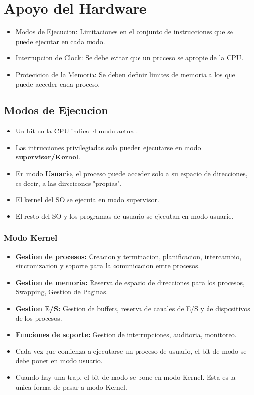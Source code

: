 \section{Apoyo del Hardware}
\begin{itemize}
    \item Modos de Ejecucion: Limitaciones en el conjunto de instrucciones que se puede ejecutar en cada modo.
    \item Interrupcion de Clock: Se debe evitar que un proceso se apropie de la CPU.
    \item Protecicion de la Memoria: Se deben definir limites de memoria a los que puede acceder cada proceso.
\end{itemize}

\subsection{Modos de Ejecucion}
\begin{itemize}
    \item Un bit en la CPU indica el modo actual.
    \item Las intrucciones privilegiadas solo pueden ejecutarse en modo \textbf{supervisor/Kernel}.
    \item En modo \textbf{Usuario}, el proceso puede acceder solo a su espacio de direcciones, es decir, a las direcicones "propias".
    \item El kernel del SO se ejecuta en modo supervisor.
    \item El resto del SO y los programas de usuario se ejecutan en modo usuario.
\end{itemize}

\subsubsection{Modo Kernel}
\begin{itemize}
    \item \textbf{Gestion de procesos:} Creacion y terminacion, planificacion, intercambio, sincronizacion y soporte para la comunicacion entre procesos.
    \item \textbf{Gestion de memoria:} Reserva de espacio de direcciones para los procesos, Swapping, Gestion de Paginas.
    \item \textbf{Gestion E/S:} Gestion de buffers, reserva de canales de E/S y de dispositivos de los procesos.
    \item \textbf{Funciones de soporte:} Gestion de interrupciones, auditoria, monitoreo.
    \item Cada vez que comienza a ejecutarse un proceso de usuario, el bit de modo se debe poner en modo usuario.
    \item Cuando hay una trap, el bit de modo se pone en modo Kernel. Esta es la unica forma de pasar a modo Kernel.
\end{itemize}
